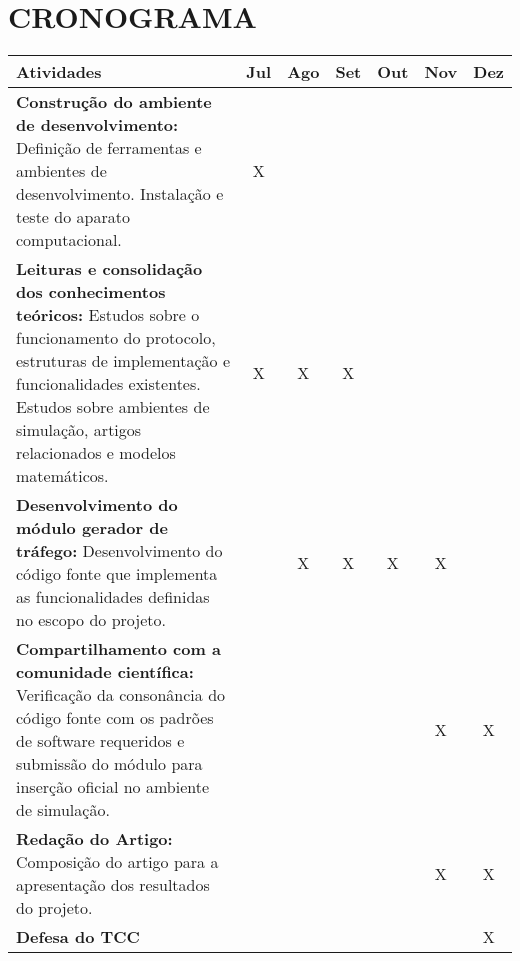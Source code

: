 \newpage

\section{CRONOGRAMA}
\label{sec:cronograma}


\begin{center}
	\begin{tabular}{ |p{8cm}|c|c|c|c|c|c| }
		\hline
		\textbf{Atividades} & \textbf{Jul} & \textbf{Ago} & \textbf{Set} & \textbf{Out} & \textbf{Nov} & \textbf{Dez} \\
		\hline
		\textbf{Construção do ambiente de desenvolvimento:} Definição de ferramentas e ambientes de desenvolvimento. Instalação e teste do aparato computacional. & X &  &  &  &  &  \\
		\hline
		\textbf{Leituras e consolidação dos conhecimentos teóricos:} Estudos sobre o funcionamento do protocolo, estruturas de implementação e funcionalidades existentes. Estudos sobre ambientes de simulação, artigos relacionados e modelos matemáticos. & X & X & X &  &  &  \\
		\hline
		\textbf{Desenvolvimento do módulo gerador de tráfego:} Desenvolvimento do código fonte que implementa as funcionalidades definidas no escopo do projeto. &  & X & X & X & X &  \\
		\hline
		\textbf{Compartilhamento com a comunidade científica:} Verificação da consonância do código fonte com os padrões de software requeridos e submissão do módulo para inserção oficial no ambiente de simulação. &  &  &  &  & X & X \\
		\hline
		\textbf{Redação do Artigo:} Composição do artigo para a apresentação dos resultados do projeto. &  &  &  &  & X & X \\
		\hline
		\textbf{Defesa do TCC} &  &  &  &  &  & X \\
		\hline
	\end{tabular}
\end{center}
